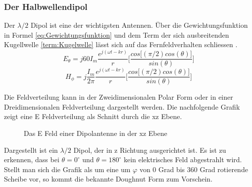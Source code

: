 \subsubsection{Der Halbwellendipol}
Der $\lambda/2$ Dipol ist eine der wichtigsten Antennen. Über die Gewichtungsfunktion in Formel \ref{eq:Gewichtungsfunktion} und dem Term der sich ausbreitenden Kugellwelle \ref{term:Kugelwelle} lässt sich auf das Fernfeldverhalten schliessen \cite{elliott1981antenna}.
\begin{equation}
E_{\theta}=j60I_{m} \frac{e^{j(\omega t - kr)}}{r} \lbrack \frac{cos\lbrack  (\pi/2) cos(\theta)\rbrack}{sin(\theta)} \rbrack
\end{equation}
\begin{equation}
H_{\phi}=j \frac{I_{m}}{2\pi} \frac{e^{j(\omega t - kr)}}{r} \lbrack \frac{cos\lbrack  (\pi/2) cos(\theta)\rbrack}{sin(\theta)} \rbrack
\end{equation}

Die Feldverteilung kann in der  Zweidimensionalen Polar Form oder in einer Dreidimensionalen Feldverteilung dargestellt werden.
Die nachfolgende Grafik zeigt eine E Feldverteilung als Schnitt durch die xz Ebene.\\

\begin{figure}[h]
\begin{center}
\end{center}
	\caption{Das E Feld einer Dipolantenne in der xz Ebene}
	\label{fig:DipolEFerd}
\end{figure}



Dargestellt ist ein $\lambda/2$ Dipol, der in z Richtung ausgerichtet ist. Es ist zu erkennen, dass bei $\theta = 0 ^\circ $  und $\theta = 180 ^\circ $ kein elektrisches Feld abgestrahlt wird. Stellt man sich die Grafik als um eine um $\varphi$ von 0 Grad bis 360 Grad rotierende Scheibe vor, so kommt die bekannte Doughnut Form zum Vorschein.

